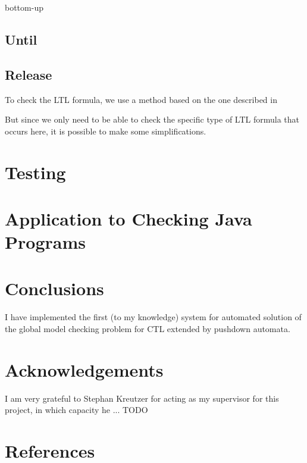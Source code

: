 \documentclass[11pt]{article}
\begin{document}
bottom-up

\subsection{Until}

\subsection{Release}
To check the LTL formula, we use a method based on the one described in \cite{EHRS00b} %

But since we only need to be able to check the specific type of LTL formula
that occurs here, it is possible to make some simplifications.

\section{Testing}





\section{Application to Checking Java Programs}


\section{Conclusions}

I have implemented the first (to my knowledge) system for automated solution of
the global model checking problem for CTL extended by pushdown automata.





\section{Acknowledgements}

I am very grateful to Stephan Kreutzer for acting as my supervisor for this project, in which capacity he ... TODO


\section{References}
{}

\end{document}
